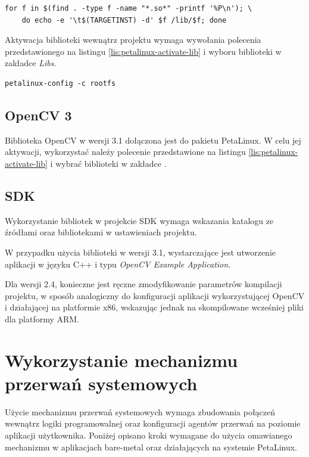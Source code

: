 \begin{lstlisting}[breaklines=true]
for f in $(find . -type f -name "*.so*" -printf '%P\n'); \
	do echo -e '\t$(TARGETINST) -d' $f /lib/$f; done
\end{lstlisting}

Aktywacja biblioteki wewnątrz projektu wymaga wywołania polecenia przedstawionego na listingu \ref{lis:petalinux-activate-lib} i wyboru biblioteki w zakładce \textit{Libs}. 

\begin{lstlisting}[caption=Dołączenie biblioteki do projektu PetaLinux., label=lis:petalinux-activate-lib]
petalinux-config -c rootfs
\end{lstlisting}


\subsection{OpenCV 3}
Biblioteka OpenCV w wersji 3.1 dołączona jest do pakietu PetaLinux. W celu jej aktywacji, wykorzystać należy polecenie przedstawione na listingu \ref{lis:petalinux-activate-lib} i wybrać biblioteki w zakładce .

\subsection{SDK}
Wykorzystanie bibliotek w projekcie SDK wymaga wskazania katalogu ze źródłami oraz bibliotekami w ustawieniach projektu.

W przypadku użycia biblioteki w wersji 3.1, wystarczające jest utworzenie aplikacji w języku C++ i typu \textit{OpenCV Example Application}.

Dla wersji 2.4, konieczne jest ręczne zmodyfikowanie parametrów kompilacji projektu, w sposób analogiczny do konfiguracji aplikacji wykorzystującej OpenCV i działającej na platformie x86, wskazując jednak na skompilowane wcześniej pliki dla platformy ARM.
\section{Wykorzystanie mechanizmu przerwań systemowych}
\label{sec:interrupts-config}
Użycie mechanizmu przerwań systemowych wymaga zbudowania połączeń wewnątrz logiki programowalnej oraz konfiguracji agentów przerwań na poziomie aplikacji użytkownika. Poniżej opisano kroki wymagane do użycia omawianego mechanizmu w aplikacjach bare-metal oraz działających na systemie PetaLinux.

